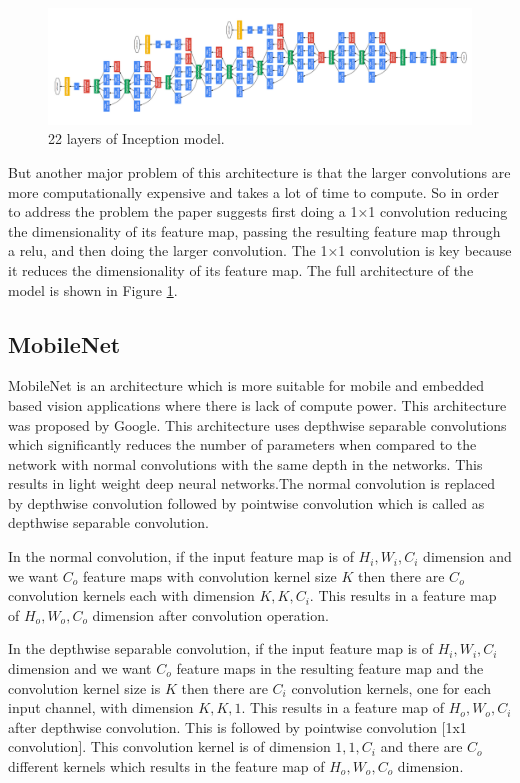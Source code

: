 \documentclass[12pt]{report}
\begin{document}
\begin{figure}[h]
\centering
\includegraphics[width=1\textwidth]{Pic3}
\caption{22 layers of Inception model.}
\label{fig:test6}
\end{figure}

\noindent But another major problem of this architecture is that the larger convolutions are more computationally expensive and takes a lot of time to compute. So in order to address the problem the paper suggests first doing a 1×1 convolution  reducing the dimensionality of its feature map, passing the resulting feature map through a relu, and then doing the larger convolution. The 1×1 convolution is key because it reduces the dimensionality of its feature map. The full architecture of the model is shown in Figure \ref{fig:test6}.

\subsection{MobileNet} 

MobileNet is an architecture which is more suitable for mobile and embedded based vision applications where there is lack of compute power.\cite{MobileNet} This architecture was proposed by Google. This architecture uses depthwise separable convolutions which significantly reduces the number of parameters when compared to the network with normal convolutions with the same depth in the networks. This results in light weight deep neural networks.The normal convolution is replaced by depthwise convolution followed by pointwise convolution which is called as depthwise separable convolution. 

\noindent In the normal convolution, if the input feature map is of $H_i,W_i,C_i$ dimension and we want $C_o$ feature maps with convolution kernel size $K$ then there are $C_o$ convolution kernels each with dimension $K,K,C_i$. This results in a feature map of $H_o,W_o,C_o$ dimension after convolution operation.

\noindent In the depthwise separable convolution, if the input feature map is of $H_i,W_i,C_i$ dimension and we want $C_o$ feature maps in the resulting feature map and the convolution kernel size is $K$ then there are $C_i$ convolution kernels, one for each input channel, with dimension $K,K,1$. This results in a feature map of $H_o,W_o,C_i$ after depthwise convolution. This is followed by pointwise convolution [1x1 convolution]. This convolution kernel is of dimension $1,1,C_i$ and there are $C_o$ different kernels which results in the feature map of $H_o,W_o,C_o$ dimension.
\end{document}
